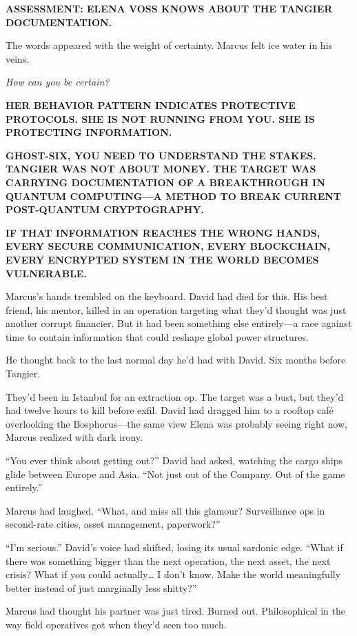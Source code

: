 \documentclass[12pt,letterpaper]{book}
\begin{document}
\textbf{ASSESSMENT: ELENA VOSS KNOWS ABOUT THE TANGIER DOCUMENTATION.}

The words appeared with the weight of certainty. Marcus felt ice water in his veins.

\emph{How can you be certain?}

\textbf{HER BEHAVIOR PATTERN INDICATES PROTECTIVE PROTOCOLS. SHE IS NOT RUNNING FROM YOU. SHE IS PROTECTING INFORMATION.}

\textbf{GHOST-SIX, YOU NEED TO UNDERSTAND THE STAKES. TANGIER WAS NOT ABOUT MONEY. THE TARGET WAS CARRYING DOCUMENTATION OF A BREAKTHROUGH IN QUANTUM COMPUTING---A METHOD TO BREAK CURRENT POST-QUANTUM CRYPTOGRAPHY.}

\textbf{IF THAT INFORMATION REACHES THE WRONG HANDS, EVERY SECURE COMMUNICATION, EVERY BLOCKCHAIN, EVERY ENCRYPTED SYSTEM IN THE WORLD BECOMES VULNERABLE.}

Marcus's hands trembled on the keyboard. David had died for this. His best friend, his mentor, killed in an operation targeting what they'd thought was just another corrupt financier. But it had been something else entirely---a race against time to contain information that could reshape global power structures.

He thought back to the last normal day he'd had with David. Six months before Tangier.

They'd been in Istanbul for an extraction op. The target was a bust, but they'd had twelve hours to kill before exfil. David had dragged him to a rooftop café overlooking the Bosphorus---the same view Elena was probably seeing right now, Marcus realized with dark irony.

``You ever think about getting out?'' David had asked, watching the cargo ships glide between Europe and Asia. ``Not just out of the Company. Out of the game entirely.''

Marcus had laughed. ``What, and miss all this glamour? Surveillance ops in second-rate cities, asset management, paperwork?''

``I'm serious.'' David's voice had shifted, losing its usual sardonic edge. ``What if there was something bigger than the next operation, the next asset, the next crisis? What if you could actually\ldots{} I don't know. Make the world meaningfully better instead of just marginally less shitty?''

Marcus had thought his partner was just tired. Burned out. Philosophical in the way field operatives got when they'd seen too much.
\end{document}
